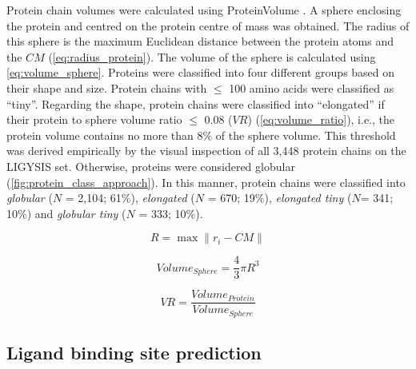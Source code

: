 Protein chain volumes were calculated using ProteinVolume \cite{CHEN_2015_PROTEINVOLUME}. A sphere enclosing the protein and centred on the protein centre of mass was obtained. The radius of this sphere is the maximum Euclidean distance between the protein atoms and the $CM$ (\autoref{eq:radius_protein}). The volume of the sphere is calculated using \autoref{eq:volume_sphere}. Proteins were classified into four different groups based on their shape and size. Protein chains with $\leq$ 100 amino acids were classified as ``tiny''. Regarding the shape, protein chains were classified into ``elongated'' if their protein to sphere volume ratio $\leq$ 0.08 ($VR$) (\autoref{eq:volume_ratio}), i.e., the protein volume contains no more than 8\% of the sphere volume. This threshold was derived empirically by the visual inspection of all 3,448 protein chains on the LIGYSIS set. Otherwise, proteins were considered globular (\autoref{fig:protein_class_approach}). In this manner, protein chains were classified into \textit{globular} ($N$ = 2,104; 61\%), \textit{elongated} ($N$ = 670; 19\%), \textit{elongated tiny} ($N$= 341; 10\%) and \textit{globular tiny} ($N$ = 333; 10\%).

\begin{equation}
R = \max \| r_i - CM \|
\label{eq:radius_protein}
\end{equation}

\begin{equation}
Volume_{Sphere} = \frac{4}{3} \pi R^3
\label{eq:volume_sphere}
\end{equation}

\begin{equation}
VR = \frac{Volume_{Protein}}{Volume_{Sphere}}
\label{eq:volume_ratio}
\end{equation}

\FloatBarrier

\subsection{Ligand binding site prediction}

